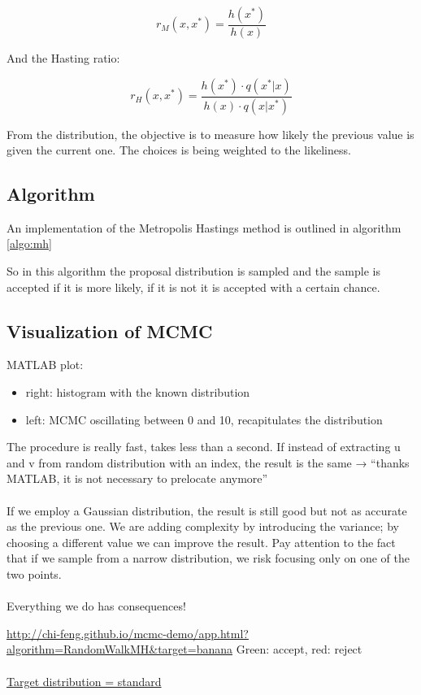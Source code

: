 $$r_M(x,x^*)=\frac{h(x^*)}{h(x)}$$

And the Hasting ratio:

$$r_H(x,x^*)=\frac{h(x^*)\cdot q(x^*|x)}{h(x)\cdot q(x|x^*)}$$

From the distribution, the objective is to measure how likely the previous value is given the current one.
The choices is being weighted to the likeliness.

  \subsection{Algorithm}
  An implementation of the Metropolis Hastings method is outlined in algorithm \ref{algo:mh}

  

  So in this algorithm the proposal distribution is sampled and the sample is accepted if it is more likely, if it is not it is accepted with a certain chance.


  \subsection{Visualization of MCMC}
  MATLAB plot:

  \begin{itemize}
  \item
    right: histogram with the known distribution
  \item
    left: MCMC oscillating between 0 and 10, recapitulates the
    distribution
  \end{itemize}
  \noindent
  The procedure is really fast, takes less than a second. If instead of
  extracting u and v from random distribution with an index, the result is
  the same → ``thanks MATLAB, it is not necessary to prelocate anymore''
  \\
  \\
  \noindent
  If we employ a Gaussian distribution, the result is still good but not
  as accurate as the previous one. We are adding complexity by introducing
  the variance; by choosing a different value we can improve the result.
  Pay attention to the fact that if we sample from a narrow distribution,
  we risk focusing only on one of the two points.
  \\
  \\
  \noindent
  Everything we do has consequences!

  \url{http://chi-feng.github.io/mcmc-demo/app.html?algorithm=RandomWalkMH\&target=banana}
  \noindent
  Green: accept, red: reject
  \\
  \\
  \noindent
  \underline{Target distribution = standard}

